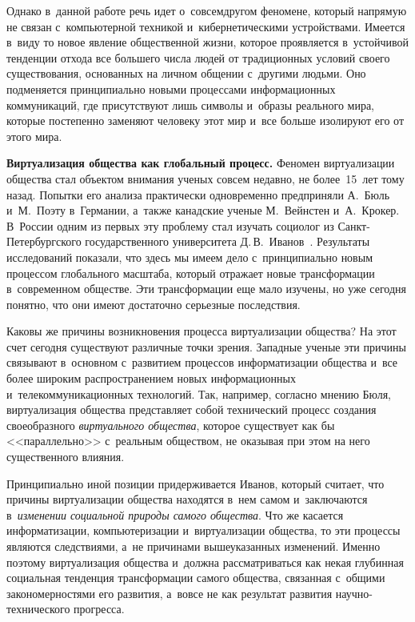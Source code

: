 \begin{multicols}{2}
{}
     
     Однако в~данной работе речь идет о~совсем\linebreak другом феномене, который 
напрямую не связан с~компьютерной техникой и~кибернетическими 
устройствами. Имеется в~виду то новое явление общественной жизни, 
которое проявляется в~устойчивой тенденции отхода все большего числа 
людей от традиционных условий своего существования, основанных на 
личном общении с~другими людьми. Оно подменяется принципиально 
новыми процессами информационных коммуникаций, где присутствуют 
лишь символы и~образы реального мира, которые постепенно заменяют 
человеку этот мир и~все больше изолируют его от этого мира.
    
    \textbf{Виртуализация общества как глобальный процесс.} Феномен 
виртуализации общества стал объектом внимания ученых совсем недавно, не 
более~15~лет тому назад. Попытки его анализа практически 
одновременно предприняли А.~Бюль и~М.~Поэту в~Германии, а~также 
канадские ученые М.~Вейнстен и~А.~Крокер. В~России одним из первых эту 
проблему стал изучать социолог из Санкт-Пе\-тер\-бург\-ско\-го 
государственного университета Д.\,В.~Иванов~\cite{23-kol}. Результаты 
исследований показали, что здесь мы имеем дело с~принципиально новым 
процессом глобального масштаба, который отражает новые трансформации 
в~современном обществе. Эти трансформации еще мало изучены, но уже 
сегодня понятно, что они имеют достаточно серьезные последствия.
     
     Каковы же причины возникновения процесса виртуализации общества? 
На этот счет сегодня существуют различные точки зрения. Западные ученые 
эти причины связывают в~основном с~развитием процессов информатизации 
общества и~все более широким распространением новых информационных 
и~телекоммуникационных технологий. Так, например, согласно мнению 
Бюля, виртуализация общества представляет собой технический процесс 
создания своеобразного \textit{виртуального общества}, которое существует 
как бы <<параллельно>> с~реальным обществом, не оказывая при этом на 
него существенного влияния. 
     
     Принципиально иной позиции придерживается Иванов, который 
считает, что причины виртуализации общества находятся в~нем самом 
и~заключаются в~\textit{изменении социальной природы самого общества}. 
Что же касается информатизации, компьютеризации и~виртуализации 
общества, то эти процессы являются следствиями, а~не причинами 
вышеуказанных изменений. Именно поэтому виртуализация общества 
и~должна рассматриваться как некая глубинная социальная тенденция 
трансформации самого общества, связанная с~общими закономерностями его 
развития, а~вовсе не как результат развития научно-технического прогресса. 
     

\end{multicols}

